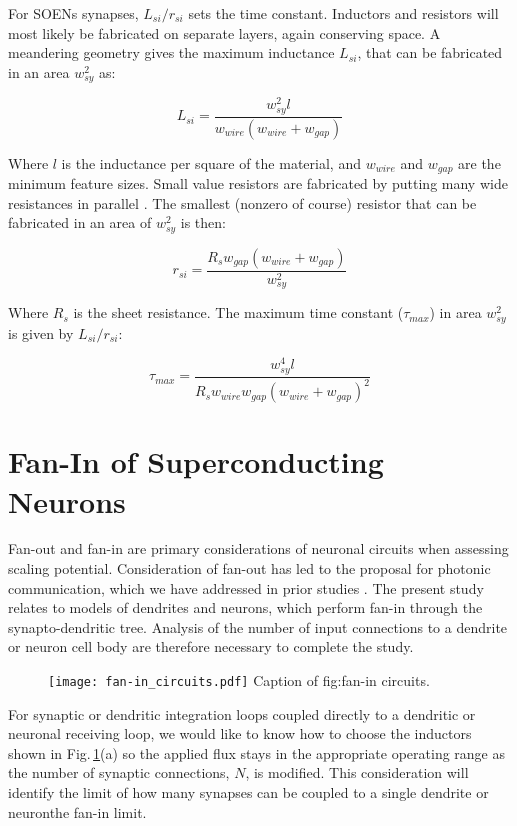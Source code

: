 \documentclass[twocolumn]{article}
\begin{document}
For SOENs synapses, $L_{si}/r_{si}$ sets the time constant. Inductors and resistors will most likely be fabricated on separate layers, again conserving space. A meandering geometry gives the maximum inductance $L_{si}$, that can be fabricated in an area $w_{sy}^2$ as:

\begin{equation}
    L_{si} = \frac{w_{sy}^2l}{w_{wire}(w_{wire} + w_{gap})} 
\end{equation}

Where $l$ is the inductance per square of the material, and $w_{wire}$ and $w_{gap}$ are the minimum feature sizes. Small value resistors are fabricated by putting many wide resistances in parallel \cite{}. The smallest (nonzero of course) resistor that can be fabricated in an area of $w_{sy}^2$ is then:

\begin{equation}
    r_{si} = \frac{R_sw_{gap}(w_{wire} + w_{gap})}{w_{sy}^2}
\end{equation}

Where $R_s$ is the sheet resistance. The maximum time constant ($\tau_{max}$) in area $w_{sy}^2$ is given by $L_{si}/r_{si}$:

\begin{equation}
    \tau_{max} = \frac{w_{sy}^4l}{R_sw_{wire}w_{gap}(w_{wire}+w_{gap})^2}
\end{equation}

\section{Fan-In of Superconducting Neurons}
Fan-out and fan-in are primary considerations of neuronal circuits when assessing scaling potential. Consideration of fan-out has led to the proposal for photonic communication, which we have addressed in prior studies \cite{shbu2017,chbu2017,chbu2018,sh2018_ICRC,sh2019,sh2020}. The present study relates to models of dendrites and neurons, which perform fan-in through the synapto-dendritic tree. Analysis of the number of input connections to a dendrite or neuron cell body are therefore necessary to complete the study.

\begin{figure}[h!]
\texttt{[image: fan-in\_circuits.pdf]}
{\label{fig:fan-in__circuits}Caption of fig:fan-in circuits.}
\end{figure}
For synaptic or dendritic integration loops coupled directly to a dendritic or neuronal receiving loop, we would like to know how to choose the inductors shown in Fig.\,\ref{fig:fan-in__circuits}(a) so the applied flux stays in the appropriate operating range as the number of synaptic connections, $N$, is modified. This consideration will identify the limit of how many synapses can be coupled to a single dendrite or neuron\textemdash the fan-in limit. 
\end{document}
